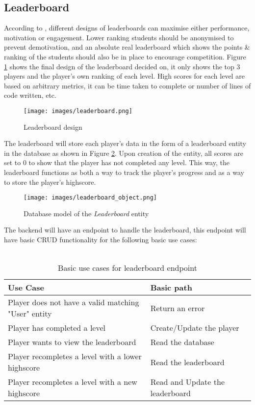 \subsection{Leaderboard}
According to \cite{https://doi.org/10.1111/jcal.13077}, different designs of leaderboards can maximise either performance, motivation or engagement. Lower ranking students should be anonymised to prevent demotivation, and an absolute real leaderboard which shows the points \& ranking of the students should also be in place to encourage competition. Figure \ref{fig:leaderboard} shows the final design of the leaderboard decided on, it only shows the top 3 players and the player's own ranking of each level. High scores for each level are based on arbitrary metrics, it can be time taken to complete or number of lines of code written, etc.
\begin{figure}[H]
    \centering
    \texttt{[image: images/leaderboard.png]}
    \caption{Leaderboard design}    
    \label{fig:leaderboard}
\end{figure}

The leaderboard will store each player's data in the form of a leaderboard entity in the database as shown in Figure \ref{fig:leaderboard_object}. Upon creation of the entity, all scores are set to 0 to show that the player has not completed any level. This way, the leaderboard functions as both a way to track the player's progress and as a way to store the player's highscore.
\begin{center} 
    \begin{figure}[H]
        \centering
        \texttt{[image: images/leaderboard\_object.png]}
        \caption{Database model of the \textit{Leaderboard} entity}    
        \label{fig:leaderboard_object}
    \end{figure}
\end{center}
The backend will have an endpoint to handle the leaderboard, this endpoint will have basic CRUD functionality for the following basic use cases:
\\\\
\begin{table}[H]
    \caption{Basic use cases for leaderboard endpoint}
    \begin{tabular}{|p{11cm}|p{5cm}|}
        \hline
        Use Case & Basic path\\
        \hline
        Player does not have a valid matching "User" entity & Return an error\\
        \hline
        Player has completed a level & Create/Update the player\\
        \hline
        Player wants to view the leaderboard & Read the database\\
        \hline
        Player recompletes a level with a lower highscore & Read the leaderboard \\
        \hline
        Player recompletes a level with a new highscore & Read and Update the leaderboard\\
        \hline
    \end{tabular}
\end{table}


